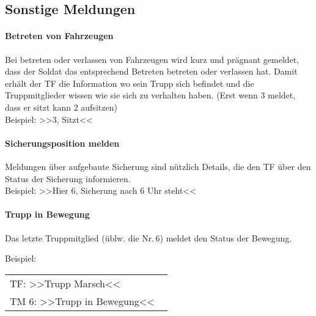 \subsection{Sonstige Meldungen}
	\paragraph*{Betreten von Fahrzeugen}
	\label{para:fahrzeug-betreten}
	Bei betreten oder verlassen von Fahrzeugen wird kurz und prägnant gemeldet, dass der Soldat das entsprechend Betreten betreten oder verlassen hat. Damit erhält der TF die Information wo sein Trupp sich befindet und die Truppmitglieder wissen wie sie sich zu verhalten haben. (Erst wenn 3 meldet, dass er sitzt kann 2 aufsitzen)\\
	Beispiel: >>3, Sitzt<<

	\paragraph*{Sicherungsposition melden}
	Meldungen über aufgebaute Sicherung sind nützlich Details, die den TF über den Status der Sicherung informieren. \\
	Beispiel: >>Hier 6, Sicherung nach 6 Uhr steht<<

	\paragraph*{Trupp in Bewegung}
	Das letzte Truppmitglied (üblw. die Nr.\,6) meldet den Status der Bewegung.\par
	Beispiel:
	\begin{longtable}{P{0.95\linewidth}}
	\toprule
	TF: >>Trupp Marsch<<\\
	\rcg TM 6: >>Trupp in Bewegung<<\\
	\bottomrule
	\end{longtable}		
	
